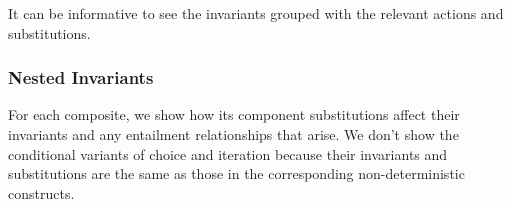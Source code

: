 It can be informative to see the invariants grouped with
the relevant actions and substitutions.

\subsubsection{Nested Invariants}

For each composite,
we show how its component substitutions affect their invariants
and any entailment relationships that arise.
We don't show the conditional variants of choice and iteration
because their invariants and substitutions are the same as those
in the corresponding non-deterministic constructs.

